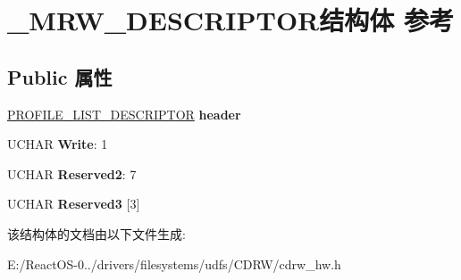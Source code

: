 \hypertarget{struct___m_r_w___d_e_s_c_r_i_p_t_o_r}{}\section{\+\_\+\+M\+R\+W\+\_\+\+D\+E\+S\+C\+R\+I\+P\+T\+O\+R结构体 参考}
\label{struct___m_r_w___d_e_s_c_r_i_p_t_o_r}
\subsection*{Public 属性}
\begin{DoxyCompactItemize}
\item 
\mbox{\label{struct___m_r_w___d_e_s_c_r_i_p_t_o_r_a229400fb9ec2f6a48c3d727e815804a2}} 
\hyperlink{struct___p_r_o_f_i_l_e___l_i_s_t___d_e_s_c_r_i_p_t_o_r}{P\+R\+O\+F\+I\+L\+E\+\_\+\+L\+I\+S\+T\+\_\+\+D\+E\+S\+C\+R\+I\+P\+T\+OR} {\bfseries header}
\item 
\mbox{\label{struct___m_r_w___d_e_s_c_r_i_p_t_o_r_a6bd6ae6b0ffa3d30d5730433128696f2}} 
U\+C\+H\+AR {\bfseries Write}\+: 1
\item 
\mbox{\label{struct___m_r_w___d_e_s_c_r_i_p_t_o_r_a36e46433131a5901b9a0efd67002c1b9}} 
U\+C\+H\+AR {\bfseries Reserved2}\+: 7
\item 
\mbox{\label{struct___m_r_w___d_e_s_c_r_i_p_t_o_r_a665b69507c5a0ee4f76ba5b9cca21109}} 
U\+C\+H\+AR {\bfseries Reserved3} \mbox{[}3\mbox{]}
\end{DoxyCompactItemize}


该结构体的文档由以下文件生成\+:\begin{DoxyCompactItemize}
\item 
E\+:/\+React\+O\+S-\/0../drivers/filesystems/udfs/\+C\+D\+R\+W/cdrw\+\_\+hw.\+h\end{DoxyCompactItemize}
